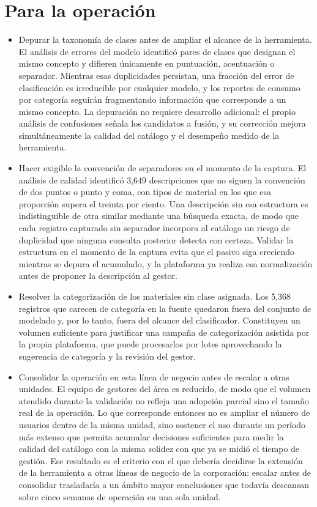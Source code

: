 \section*{Para la operación}

\begin{itemize}
\item Depurar la taxonomía de clases antes de ampliar el alcance de la herramienta. El análisis de errores del modelo identificó pares de clases que designan el mismo concepto y difieren únicamente en puntuación, acentuación o separador. Mientras esas duplicidades persistan, una fracción del error de clasificación es irreducible por cualquier modelo, y los reportes de consumo por categoría seguirán fragmentando información que corresponde a un mismo concepto. La depuración no requiere desarrollo adicional: el propio análisis de confusiones señala los candidatos a fusión, y su corrección mejora simultáneamente la calidad del catálogo y el desempeño medido de la herramienta.

\item Hacer exigible la convención de separadores en el momento de la captura. El análisis de calidad identificó 3,649 descripciones que no siguen la convención de dos puntos o punto y coma, con tipos de material en los que esa proporción supera el treinta por ciento. Una descripción sin esa estructura es indistinguible de otra similar mediante una búsqueda exacta, de modo que cada registro capturado sin separador incorpora al catálogo un riesgo de duplicidad que ninguna consulta posterior detecta con certeza. Validar la estructura en el momento de la captura evita que el pasivo siga creciendo mientras se depura el acumulado, y la plataforma ya realiza esa normalización antes de proponer la descripción al gestor.

\item Resolver la categorización de los materiales sin clase asignada. Los 5,368 registros que carecen de categoría en la fuente quedaron fuera del conjunto de modelado y, por lo tanto, fuera del alcance del clasificador. Constituyen un volumen suficiente para justificar una campaña de categorización asistida por la propia plataforma, que puede procesarlos por lotes aprovechando la sugerencia de categoría y la revisión del gestor.

\item Consolidar la operación en esta línea de negocio antes de escalar a otras unidades. El equipo de gestores del área es reducido, de modo que el volumen atendido durante la validación no refleja una adopción parcial sino el tamaño real de la operación. Lo que corresponde entonces no es ampliar el número de usuarios dentro de la misma unidad, sino sostener el uso durante un período más extenso que permita acumular decisiones suficientes para medir la calidad del catálogo con la misma solidez con que ya se midió el tiempo de gestión. Ese resultado es el criterio con el que debería decidirse la extensión de la herramienta a otras líneas de negocio de la corporación: escalar antes de consolidar trasladaría a un ámbito mayor conclusiones que todavía descansan sobre cinco semanas de operación en una sola unidad.


\end{itemize}
